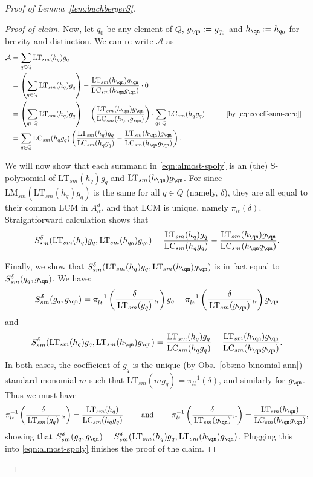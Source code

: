 \documentclass[11pt,reqno]{amsart}
\newcommand*{\eqcomment}[2][\qquad]{#1 &&\text{[#2]}}
\newcommand{\ltfrac}[2]{\frac{\,#1\,}{\,#2\,}{}_{{\scriptscriptstyle lt}}}
\newcommand{\lmsm}{\text{LM}_{sm}}
\newcommand{\lcsm}{\text{LC}_{sm}}
\newcommand{\ltsm}{\text{LT}_{sm}}
\newcommand{\Ssm}{S_{sm}}
\newcommand{\piltd}{\pi_{lt}}
\theoremstyle{definition}
\numberwithin{equation}{section}
\begin{document}
\begin{proof}[Proof of Lemma~\ref{lem:buchbergerS}]
\begin{proof}[Proof of claim]
Now, let $q_0$ be any element of $Q$, $g_{\qn} := g_{q_0}$ and $h_{\qn} := h_{q_0}$ for brevity and distinction. We can re-write $\mathcal{A}$ as
\begin{align}
\mathcal{A} &= \sum_{q \in Q} \ltsm(h_q)g_q \nonumber \\
&= \left(\sum_{q \in Q} \ltsm(h_q)g_q\right) - \frac{\ltsm(h_{\qn})g_{\qn}}{\lcsm(h_{\qn}g_{\qn})} \cdot 0 \nonumber \\
&= \left(\sum_{q \in Q} \ltsm(h_q)g_q\right) - \left(\frac{\ltsm(h_{\qn})g_{\qn}}{\lcsm(h_{\qn}g_{\qn})} \right) \cdot \sum_{q \in Q}\lcsm(h_qg_q) \eqcomment{by \eqref{eqn:coeff-sum-zero}} \nonumber \\
&= \sum_{q \in Q} \lcsm(h_qg_q)\left(\frac{\ltsm(h_q)g_q}{\lcsm(h_qg_q)} - \frac{\ltsm(h_{\qn})g_{\qn}}{\lcsm(h_{\qn}g_{\qn})}\right). \label{eqn:almost-spoly} \\
\end{align}

We will now show that each summand in \eqref{eqn:almost-spoly} is an (the) S-polynomial of $\ltsm(h_q)g_q$ and $\ltsm(h_{\qn}) g_{\qn}$. 
For since $\lmsm(\ltsm(h_q) g_q)$ is the same for all $q \in Q$ (namely, $\delta$), they are all equal to their common LCM in $A_{lt}^d$, and that LCM is unique, namely $\piltd(\delta)$. Straightforward calculation shows that 
\[
\Ssm^\delta (\ltsm(h_q) g_q, \ltsm(h_{q_0}) g_{q_0}) = \frac{\ltsm(h_{q})g_{q}}{\lcsm(h_{q}g_q)} - \frac{\ltsm(h_{\qn})g_{\qn}}{\lcsm(h_{\qn}q_{\qn})}.
\]

Finally, we show that $\Ssm^{\delta}(\ltsm(h_q) g_q, \ltsm(h_{\qn}) g_{\qn})$ is in fact equal to $\Ssm^\delta(g_q, g_{\qn})$. We have:
\[
\Ssm^{\delta}(g_q, g_{\qn}) = \pi_{lt}^{-1}\left(\ltfrac{\delta}{\ltsm(g_q)} \right) g_q - \pi_{lt}^{-1}\left(\ltfrac{\delta}{\ltsm(g_{\qn})} \right) g_{\qn} 
\]
and
\[
\Ssm^{\delta}(\ltsm(h_q) g_q, \ltsm(h_{\qn}) g_{\qn}) = \frac{\ltsm(h_q) g_q}{\lcsm(h_q g_q)} - \frac{\ltsm(h_{\qn}) g_{\qn}}{\lcsm(h_{\qn} g_{\qn})}.
\]
In both cases, the coefficient of $g_q$ is the unique (by Obs.~\ref{obs:no-binomial-ann}) standard monomial $m$ such that $\ltsm(m g_q) = \pi_{lt}^{-1}(\delta)$, and similarly for $g_{\qn}$. Thus we must have
\[
\pi_{lt}^{-1}\left(\ltfrac{\delta}{\ltsm(g_q)} \right) = \frac{\ltsm(h_q)}{\lcsm(h_q g_q)}  \qquad \text{ and } \qquad \pi_{lt}^{-1}\left(\ltfrac{\delta}{\ltsm(g_{\qn})} \right)  = \frac{\ltsm(h_{\qn})}{\lcsm(h_{\qn} g_{\qn})},
\]
showing that $\Ssm^\delta(g_q, g_{\qn}) = \Ssm^{\delta}(\ltsm(h_q) g_q, \ltsm(h_{\qn}) g_{\qn})$. Plugging this into \eqref{eqn:almost-spoly} finishes the proof of the claim.
\end{proof}


\end{proof}
\end{document}

